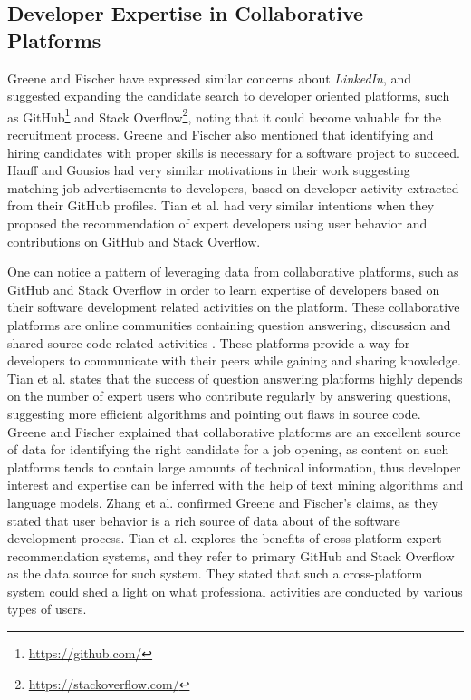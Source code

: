         \subsection{Developer Expertise in Collaborative Platforms}
            Greene and Fischer \cite{greene2016cvexplorer} have expressed similar concerns about \emph{LinkedIn}, and suggested expanding the candidate search to developer oriented platforms, such as GitHub\footnote{\url{https://github.com/}} and Stack Overflow\footnote{\url{https://stackoverflow.com/}}, noting that it could become valuable for the recruitment process. Greene and Fischer also mentioned that identifying and hiring candidates with proper skills is necessary for a software project to succeed. Hauff and Gousios \cite{hauff2015matching} had very similar motivations in their work suggesting matching job advertisements to developers, based on developer activity extracted from their GitHub profiles. Tian et al. \cite{tian2019geek} had very similar intentions when they proposed the recommendation of expert developers using user behavior and contributions on GitHub and Stack Overflow.
            
            One can notice a pattern of leveraging data from collaborative platforms, such as GitHub and Stack Overflow in order to learn expertise of developers based on their software development related activities on the platform. These collaborative platforms are online communities containing question answering, discussion and shared source code related activities \cite{wang2018survey}. These platforms provide a way for developers to communicate with their peers while gaining and sharing knowledge. Tian et al. \cite{tian2019geek} states that the success of question answering platforms highly depends on the number of expert users who contribute regularly by answering questions, suggesting more efficient algorithms and pointing out flaws in source code. Greene and Fischer \cite{greene2016cvexplorer} explained that collaborative platforms are an excellent source of data for identifying the right candidate for a job opening, as content on such platforms tends to contain large amounts of technical information, thus developer interest and expertise can be inferred with the help of text mining algorithms and language models. Zhang et al. \cite{zhang2014recommending} confirmed Greene and Fischer's claims, as they stated that user behavior is a rich source of data about of the software development process. Tian et al. \cite{tian2019geek} explores the benefits of cross-platform expert recommendation systems, and they refer to primary GitHub and Stack Overflow as the data source for such system. They stated that such a cross-platform system could shed a light on what professional activities are conducted by various types of users. 
            
